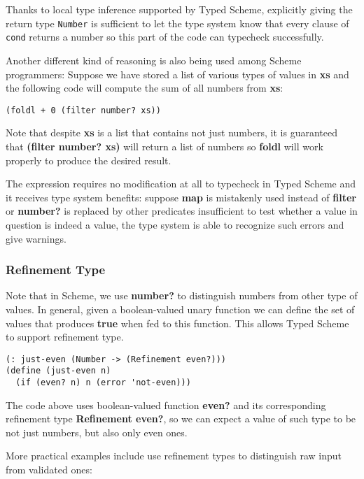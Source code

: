 Thanks to local type inference supported by Typed Scheme,
explicitly giving the return type \texttt{Number}
is sufficient to let the type system know that every clause of \texttt{cond} returns a number
so this part of the code can typecheck successfully.


Another different kind of reasoning is also being used among Scheme programmers:
Suppose we have stored a list of various types of values in \textbf{xs}
and the following code will compute the sum of all numbers from \textbf{xs}:

\begin{verbatim}
(foldl + 0 (filter number? xs))
\end{verbatim}

Note that despite \textbf{xs} is a list that contains not just numbers,
it is guaranteed that \textbf{(filter number? xs)} will return a list of numbers
so \textbf{foldl} will work properly to produce the desired result.

The expression requires no modification at all to typecheck in Typed Scheme
and it receives type system benefits: suppose \textbf{map} is mistakenly
used instead of \textbf{filter} or \textbf{number?} is replaced by
other predicates insufficient to test whether a value in question is indeed a value,
the type system is able to recognize such errors and give warnings.

\subsubsection{Refinement Type}

Note that in Scheme, we use \textbf{number?} to distinguish numbers
from other type of values.
In general, given a boolean-valued unary function
we can define the set of values that produces \textbf{true} when fed to this function.
This allows Typed Scheme to support refinement type.

\begin{verbatim}
(: just-even (Number -> (Refinement even?)))
(define (just-even n)
  (if (even? n) n (error 'not-even)))
\end{verbatim}

The code above uses boolean-valued function \textbf{even?}
and its corresponding refinement type \textbf{Refinement even?},
so we can expect a value of such type to be not just numbers, but also only even ones.

More practical examples include use refinement types to distinguish raw input
from validated ones:

